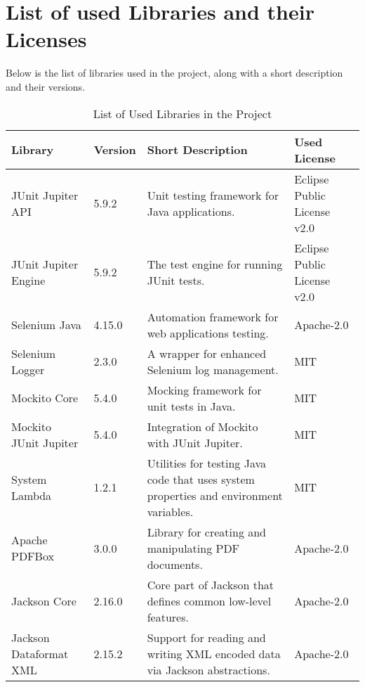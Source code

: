 \section{List of used Libraries and their Licenses}\label{sec:used-libraries}
Below is the list of libraries used in the project, along with a short description and their versions.
\begin{table}[ht!]
    \centering
    \setupBfhTabular
    \begin{tabular}{|p{4cm}|p{1cm}|p{5cm}|p{3cm}|} %
        \rowcolor{BFH-tablehead}
        \textbf{Library}       & \textbf{Version} & \textbf{Short Description}                                                             & \textbf{Used License}                            \\
        \hline
        JUnit \index{JUnit} Jupiter API & 5.9.2 & Unit testing framework for Java applications.
        & Eclipse Public License v2.0 \\
        \hline
        JUnit \index{JUnit} Jupiter Engine   & 5.9.2            & The test engine for running JUnit tests.
                                                      & Eclipse Public License v2.0 \index{Eclipse Public License v2.0 (EPL-2.0)} \\
        \hline
        Selenium Java \index{Selenium}          & 4.15.0           & Automation framework for web applications testing.
                                            & Apache-2.0 \\
        \hline
        Selenium Logger \index{Selenium}       & 2.3.0           & A wrapper for enhanced Selenium log management.
        & MIT \\
        \hline
        Mockito Core           & 5.4.0            & Mocking framework for unit tests in Java.
                                                     & MIT \\
        \hline
        Mockito JUnit \index{JUnit} Jupiter  & 5.4.0            & Integration of Mockito with JUnit Jupiter.
                                                    & MIT \\
        \hline
        System Lambda          & 1.2.1            & Utilities for testing Java code that uses system properties and environment variables.
        & MIT \\
        \hline
        Apache PDFBox          & 3.0.0            & Library for creating and manipulating PDF documents.
                                          & Apache-2.0 \\
        \hline
        Jackson Core           & 2.16.0           & Core part of Jackson that defines common low-level features.
        & Apache-2.0  \\
        \hline
        Jackson Dataformat XML & 2.15.2           & Support for reading and writing XML encoded data via Jackson abstractions.
        & Apache-2.0 \\
        \hline
    \end{tabular}
    \caption{List of Used Libraries in the Project}
    \label{tab:used-libraries}
\end{table}

